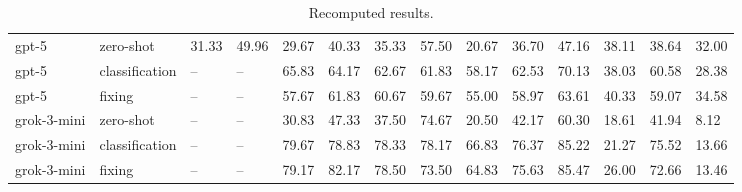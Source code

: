 \begin{table}[!t]
\begin{tabular}{llllllllllllll}
gpt-5 & zero-shot & 31.33 & 49.96 & 29.67 & 40.33 & 35.33 & 57.50 & 20.67 & 36.70 & 47.16 & 38.11 & 38.64 & 32.00 \\
gpt-5 & classification & -- & -- & 65.83 & 64.17 & 62.67 & 61.83 & 58.17 & 62.53 & 70.13 & 38.03 & 60.58 & 28.38 \\
gpt-5 & fixing & -- & -- & 57.67 & 61.83 & 60.67 & 59.67 & 55.00 & 58.97 & 63.61 & 40.33 & 59.07 & 34.58 \\
grok-3-mini & zero-shot & -- & -- & 30.83 & 47.33 & 37.50 & 74.67 & 20.50 & 42.17 & 60.30 & 18.61 & 41.94 & 8.12 \\
grok-3-mini & classification & -- & -- & 79.67 & 78.83 & 78.33 & 78.17 & 66.83 & 76.37 & 85.22 & 21.27 & 75.52 & 13.66 \\
grok-3-mini & fixing & -- & -- & 79.17 & 82.17 & 78.50 & 73.50 & 64.83 & 75.63 & 85.47 & 26.00 & 72.66 & 13.46 \\
\bottomrule
\end{tabular}
\caption{Recomputed results.}
\label{tab:consistency_per_action_by_id}
\end{table}
